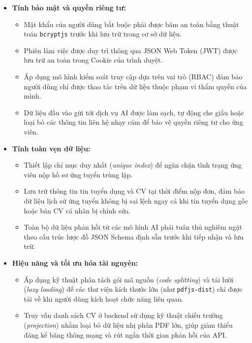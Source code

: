 \begin{itemize}
    \item \textbf{Tính bảo mật và quyền riêng tư:}
    \begin{itemize}
        \item Mật khẩu của người dùng bắt buộc phải được băm an toàn bằng thuật toán \texttt{bcryptjs} trước khi lưu trữ trong cơ sở dữ liệu.
        \item Phiên làm việc được duy trì thông qua JSON Web Token (JWT) được lưu trữ an toàn trong Cookie của trình duyệt.
        \item Áp dụng mô hình kiểm soát truy cập dựa trên vai trò (RBAC) đảm bảo người dùng chỉ được thao tác trên dữ liệu thuộc phạm vi thẩm quyền của mình.
        \item Dữ liệu đầu vào gửi tới dịch vụ AI được làm sạch, tự động che giấu hoặc loại bỏ các thông tin liên hệ nhạy cảm để bảo vệ quyền riêng tư cho ứng viên.
    \end{itemize}

    \item \textbf{Tính toàn vẹn dữ liệu:}
    \begin{itemize}
        \item Thiết lập chỉ mục duy nhất (\textit{unique index}) để ngăn chặn tình trạng ứng viên nộp hồ sơ ứng tuyển trùng lặp.
        \item Lưu trữ thông tin tin tuyển dụng và CV tại thời điểm nộp đơn, đảm bảo dữ liệu lịch sử ứng tuyển không bị sai lệch ngay cả khi tin tuyển dụng gốc hoặc bản CV cá nhân bị chỉnh sửa.
        \item Toàn bộ dữ liệu phản hồi từ các mô hình AI phải tuân thủ nghiêm ngặt theo cấu trúc lược đồ JSON Schema định sẵn trước khi tiếp nhận và lưu trữ.
    \end{itemize}

    \item \textbf{Hiệu năng và tối ưu hóa tài nguyên:}
    \begin{itemize}
        \item Áp dụng kỹ thuật phân tách gói mã nguồn (\textit{code splitting}) và tải lười (\textit{lazy loading}) để các thư viện kích thước lớn (như \texttt{pdfjs-dist}) chỉ được tải về khi người dùng kích hoạt chức năng liên quan.
        \item Truy vấn danh sách CV ở backend sử dụng kỹ thuật chiếu trường (\textit{projection}) nhằm loại bỏ dữ liệu nhị phân PDF lớn, giúp giảm thiểu đáng kể băng thông mạng và rút ngắn thời gian phản hồi của API.
    \end{itemize}


\end{itemize}
